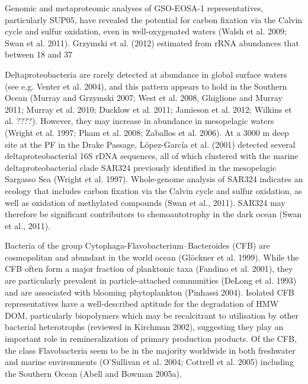 Genomic and metaproteomic analyses of GSO-EOSA-1 representatives, particularly SUP05, have revealed the potential for carbon fixation via the Calvin cycle and sulfur oxidation, even in well-oxygenated waters (Walsh et al. 2009; Swan et al. 2011). Grzymski et al. (2012) estimated from rRNA abundances that between 18 and 37%


Deltaproteobacteria are rarely detected at abundance in global surface waters (see e.g. Venter et al. 2004), and this pattern appears to hold in the Southern Ocean (Murray and Grzymski 2007; West et al. 2008, Ghiglione and Murray 2011; Murray et al. 2010; Ducklow et al. 2011; Jamieson et al. 2012; Wilkins et al. ????). However, they may increase in abundance in mesopelagic waters (Wright et al. 1997; Pham et al. 2008; Zaballos et al. 2006). At a 3000 m deep site at the PF in the Drake Passage, López-García et al. (2001) detected several deltaproteobacterial 16S rDNA sequences, all of which clustered with the marine deltaproteobacterial clade SAR324 previously identified in the mesopelagic Sargasso Sea (Wright et al. 1997). Whole-genome analysis of SAR324 indicates an ecology that includes carbon fixation via the Calvin cycle and sulfur oxidation, as well as oxidation of methylated compounds (Swan et al., 2011). SAR324 may therefore be significant contributors to chemoautotrophy in the dark ocean (Swan et al., 2011).


Bacteria of the group Cytophaga-Flavobacterium–Bacteroides (CFB) are cosmopolitan and abundant in the world ocean (Glöckner et al. 1999). While the CFB often form a major fraction of planktonic taxa (Fandino et al. 2001), they are particularly prevalent in particle-attached communities (DeLong et al. 1993) and are associated with blooming phytoplankton (Pinhassi 2004). Isolated CFB representatives have a well-described aptitude for the degradation of HMW DOM, particularly biopolymers which may be recalcitrant to utilisation by other bacterial heterotrophs (reviewed in Kirchman 2002), suggesting they play an important role in remineralization of primary production products. Of the CFB, the class Flavobacteria seem to be in the majority worldwide in both freshwater and marine environments (O'Sullivan et al. 2004; Cottrell et al. 2005) including the Southern Ocean (Abell and Bowman 2005a).

